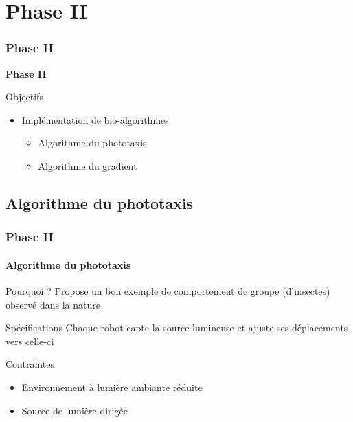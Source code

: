 \documentclass[xcolor=table]{beamer}
\begin{document}
\section{Phase II}
\begin{frame}
  \frametitle{Phase II}
  \begin{center}
    \Huge \textbf{Phase II}
  \end{center}
  \begin{block}{Objectifs}
    \begin{itemize}
      [triangle]
      \item Implémentation de bio-algorithmes
        \begin{itemize}
        \item Algorithme du phototaxis
        \item Algorithme du gradient
        \end{itemize}
    \end{itemize}
  \end{block}
\end{frame}

\subsection{Algorithme du phototaxis}
\begin{frame}[fragile]
  \frametitle{Phase II}
  \framesubtitle{Algorithme du phototaxis}
  \begin{block}{Pourquoi ?}
    Propose un bon exemple de comportement de groupe (d'insectes) observé dans la nature
  \end{block}
  \pause
  \begin{block}{Spécifications}
    Chaque robot capte la source lumineuse et ajuste ses déplacements vers celle-ci
  \end{block}
  \pause
  \begin{block}{Contraintes}
    \begin{itemize}
      [triangle]
      \item Environnement à lumière ambiante réduite
      \item Source de lumière dirigée
    \end{itemize}
  \end{block}
\end{frame}

\end{document}
